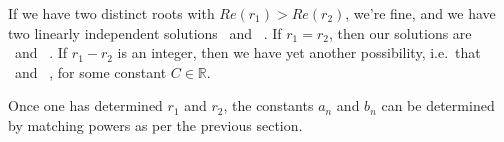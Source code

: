 \documentclass[12pt]{book}
\begin{document}
If we have two distinct roots with $Re(r_1) > Re(r_2)$, we're fine, and we 
have two linearly independent solutions
\be
{}
\quad\mbox{  and  }\quad
{}.
\ee
If $r_1=r_2$, then our solutions are
\be
{}
\quad\mbox{  and  }\quad
{}.
\ee
If $r_1-r_2$ is an integer, then we have yet another possibility, i.e.\ that
\be
{}
\quad\mbox{  and  }\quad
{},
\ee
for some constant $C\in\mathbb{R}$.

Once one has determined $r_1$ and $r_2$, the constants $a_n$ and $b_n$ can
be determined by matching powers as per the previous section.
\end{document}
